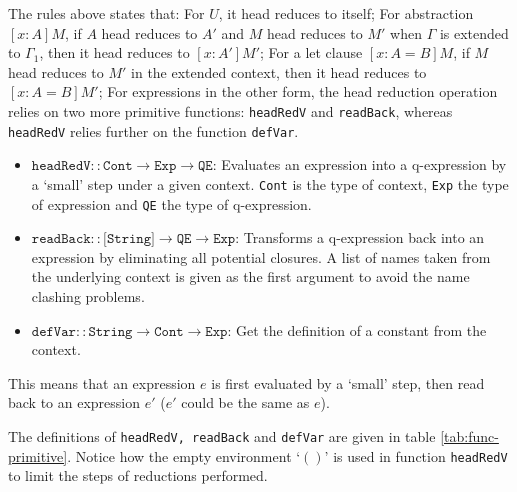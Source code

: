 \documentclass{article}
\theoremstyle{remark}
\begin{document}
The rules above states that: For $U$, it head reduces to itself; For abstraction $[x : A] M$, if $A$ head reduces to $A'$ and $M$ head reduces to $M'$ when $\Gamma$ is extended to $\Gamma_1$, then it head reduces to $[x : A'] M'$; For a let clause $[x : A = B] M$, if $M$ head reduces to $M'$ in the extended context, then it head reduces to $[x : A = B] M'$; For expressions in the other form, the head reduction operation relies on two more primitive functions: \texttt{headRedV} and \texttt{readBack}, whereas \texttt{headRedV} relies further on the function \texttt{defVar}. 
\begin{itemize}
\item $\texttt{headRedV} :: \texttt{Cont} \to \texttt{Exp} \to \texttt{QE}$: Evaluates an expression into a q-expression by a `small' step under a given context. \texttt{Cont} is the type of context, \texttt{Exp} the type of expression and \texttt{QE} the type of q-expression. 
\item $\texttt{readBack} :: \texttt{[String]} \to \texttt{QE} \to \texttt{Exp}$: Transforms a q-expression back into an expression by eliminating all potential closures. A list of names taken from the underlying context is given as the first argument to avoid the name clashing problems. 
\item $\texttt{defVar} :: \texttt{String} \to \texttt{Cont} \to \texttt{Exp}$: Get the definition of a constant from the context.
\end{itemize}
This means that an expression $e$ is first evaluated by a `small' step, then read back to an expression $e'$ ($e'$ could be the same as $e$).

The definitions of \texttt{headRedV, readBack} and \texttt{defVar} are given in table \ref{tab:func-primitive}. Notice how the empty environment `$()$' is used in function \texttt{headRedV} to limit the steps of reductions performed.
\end{document}
